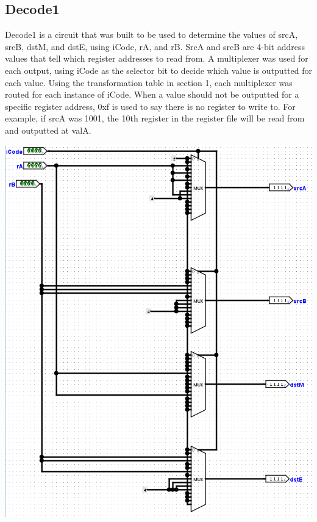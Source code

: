 \documentclass{article}
\begin{document}
\subsection{Decode1}
Decode1 is a circuit that was built to be used to determine the values of srcA, srcB, dstM, and dstE, using iCode, rA, and rB. SrcA and srcB are 4-bit address values that tell which register addresses to read from. A multiplexer was used for each output, using iCode as the selector bit to decide which value is outputted for each value. Using the transformation table in section 1, each multiplexer was routed for each instance of iCode. When a value should not be outputted for a specific register address, 0xf is used to say there is no register to write to. For example, if srcA was 1001, the 10th register in the register file will be read from and outputted at valA.
\begin{center}
    \includegraphics[scale=.6, angle = 90]{decode1.png}
\end{center}
\end{document}
